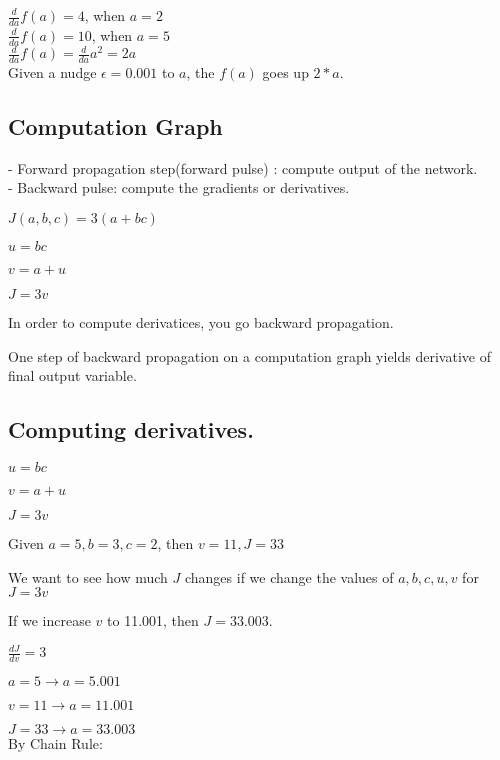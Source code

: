 \documentclass{article}
\begin{document}
    $\frac{d}{da}f(a) = 4$, when $a=2$\\

    $\frac{d}{da}f(a) = 10$, when $a=5$\\

    $\frac{d}{da}f(a) = \frac{d}{da}a^2 = 2a$\\

    Given a nudge $\epsilon= 0.001$ to $a$, the $f(a)$ goes up $2*a$.\\

\newpage
\subsection{Computation Graph}

    - Forward propagation step(forward pulse) : compute output of the network.\\
    - Backward pulse: compute the gradients or derivatives.

    $J(a,b,c) = 3(a+bc)$

    $u=bc$

    $v = a+u$

    $J=3v$

    In order to compute derivatices, you go backward propagation.

    One step of backward propagation on a computation graph yields derivative of final output variable.



\newpage
\subsection{Computing derivatives.}

    $u=bc$

    $v = a+u$

    $J=3v$

    Given $a=5, b=3, c=2$, then $v=11, J=33$

    We want to see how much $J$ changes if we change the values of $a,b,c,u,v$ for $J=3v$

    If we increase $v$ to 11.001, then $J=33.003$.

    $\frac{dJ}{dv} = 3$

    $a=5 \rightarrow a=5.001$

$v=11 \rightarrow a=11.001$

$J=33 \rightarrow a=33.003$\\

By Chain Rule:\\
\end{document}
